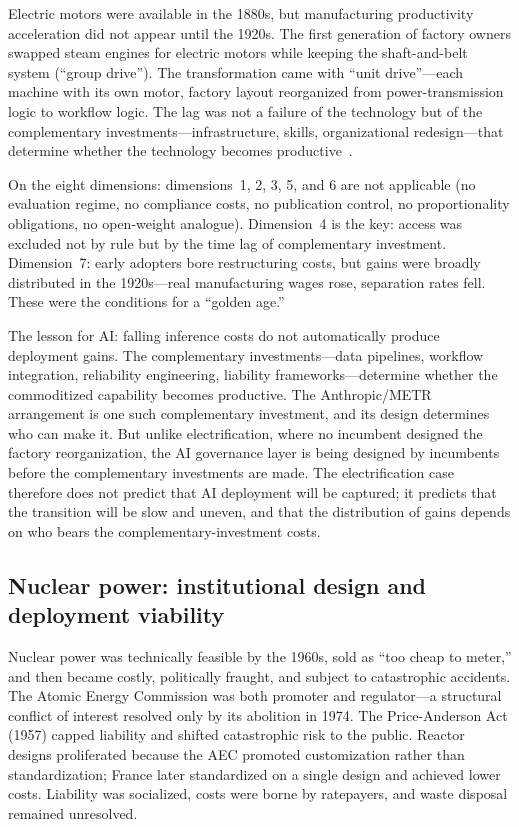 Electric motors were available in the 1880s, but manufacturing productivity acceleration did not appear until the 1920s. The first generation of factory owners swapped steam engines for electric motors while keeping the shaft-and-belt system (``group drive''). The transformation came with ``unit drive''---each machine with its own motor, factory layout reorganized from power-transmission logic to workflow logic. The lag was not a failure of the technology but of the complementary investments---infrastructure, skills, organizational redesign---that determine whether the technology becomes productive~\cite{david1990}.

On the eight dimensions: dimensions~1, 2, 3, 5, and 6 are not applicable (no evaluation regime, no compliance costs, no publication control, no proportionality obligations, no open-weight analogue). Dimension~4 is the key: access was excluded not by rule but by the time lag of complementary investment. Dimension~7: early adopters bore restructuring costs, but gains were broadly distributed in the 1920s---real manufacturing wages rose, separation rates fell. These were the conditions for a ``golden age.''

The lesson for AI: falling inference costs do not automatically produce deployment gains. The complementary investments---data pipelines, workflow integration, reliability engineering, liability frameworks---determine whether the commoditized capability becomes productive. The Anthropic/METR arrangement is one such complementary investment, and its design determines who can make it. But unlike electrification, where no incumbent designed the factory reorganization, the AI governance layer is being designed by incumbents before the complementary investments are made. The electrification case therefore does not predict that AI deployment will be captured; it predicts that the transition will be slow and uneven, and that the distribution of gains depends on who bears the complementary-investment costs.

\subsection{Nuclear power: institutional design and deployment viability}

Nuclear power was technically feasible by the 1960s, sold as ``too cheap to meter,'' and then became costly, politically fraught, and subject to catastrophic accidents. The Atomic Energy Commission was both promoter and regulator---a structural conflict of interest resolved only by its abolition in 1974. The Price-Anderson Act (1957) capped liability and shifted catastrophic risk to the public. Reactor designs proliferated because the AEC promoted customization rather than standardization; France later standardized on a single design and achieved lower costs. Liability was socialized, costs were borne by ratepayers, and waste disposal remained unresolved.

